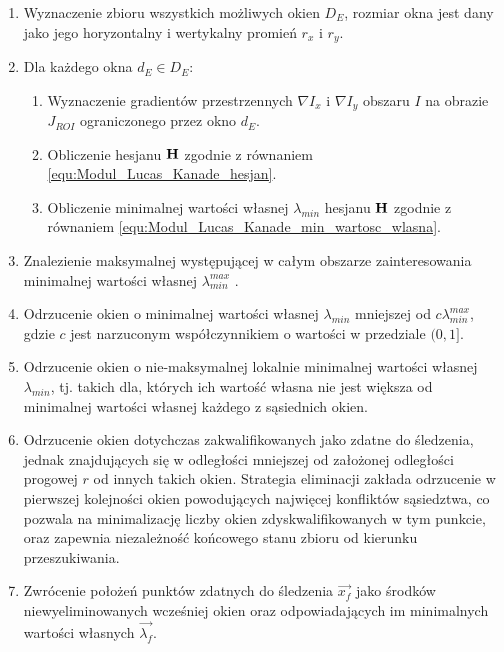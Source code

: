 \begin{enumerate}

	\item Wyznaczenie zbioru wszystkich możliwych okien $D_E$, rozmiar okna jest dany jako jego  horyzontalny i wertykalny promień $r_x$  i $r_y$.
	\item Dla każdego okna $d_E \in D_E$:
	
	\begin{enumerate}
	
		\item Wyznaczenie gradientów przestrzennych $\nabla I_{x}$ i $\nabla I_{y}$ obszaru $I$ na obrazie $J_{ROI}$ ograniczonego przez okno $d_E$.
		\item Obliczenie hesjanu $\mathbf{H}$ zgodnie z równaniem \ref{equ:Modul_Lucas_Kanade_hesjan}.
		\item Obliczenie minimalnej wartości własnej $\lambda_{min}$ hesjanu $\mathbf{H}$ zgodnie z równaniem \ref{equ:Modul_Lucas_Kanade_min_wartosc_wlasna}.
	
	\end{enumerate}

	\item Znalezienie maksymalnej występującej w całym obszarze zainteresowania minimalnej wartości własnej $\lambda^{max}_{min}$ .
	\item Odrzucenie okien o minimalnej wartości własnej $\lambda_{min}$ mniejszej od $ c \lambda^{max}_{min}$, gdzie $c$ jest narzuconym współczynnikiem o wartości w przedziale $(0,1]$.
	\item Odrzucenie okien o nie-maksymalnej lokalnie minimalnej wartości własnej $\lambda_{min}$, tj. takich dla, których ich wartość własna nie jest większa od minimalnej wartości własnej każdego z sąsiednich okien.
	\item Odrzucenie okien dotychczas zakwalifikowanych jako zdatne do śledzenia, jednak znajdujących się w odległości mniejszej od założonej odległości progowej $r$ od innych takich okien. Strategia eliminacji zakłada odrzucenie w pierwszej kolejności okien powodujących najwięcej konfliktów sąsiedztwa, co pozwala na minimalizację liczby okien zdyskwalifikowanych w tym punkcie, oraz zapewnia niezależność końcowego stanu zbioru od kierunku przeszukiwania.
	\item Zwrócenie położeń punktów zdatnych do śledzenia $\vec{x_f}$ jako środków niewyeliminowanych wcześniej okien oraz odpowiadających im minimalnych wartości własnych $\vec{\lambda_f}$.

\end{enumerate}

